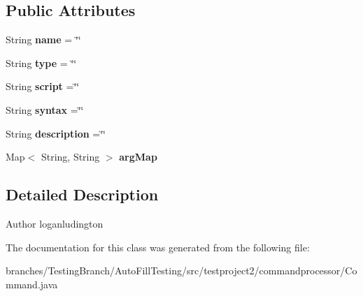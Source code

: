 \subsection*{Public Attributes}
\begin{DoxyCompactItemize}
\item 
\hypertarget{classtestproject2_1_1commandprocessor_1_1Command_a232df6f03dd12a7657d297b3897c8549}{String {\bfseries name} = \char`\"{}\char`\"{}}\label{classtestproject2_1_1commandprocessor_1_1Command_a232df6f03dd12a7657d297b3897c8549}

\item 
\hypertarget{classtestproject2_1_1commandprocessor_1_1Command_a0daaad17eed6ddd034d7e417f7db8189}{String {\bfseries type} = \char`\"{}\char`\"{}}\label{classtestproject2_1_1commandprocessor_1_1Command_a0daaad17eed6ddd034d7e417f7db8189}

\item 
\hypertarget{classtestproject2_1_1commandprocessor_1_1Command_a6afcbb229bc2c3df2165c285d01371e0}{String {\bfseries script} =\char`\"{}\char`\"{}}\label{classtestproject2_1_1commandprocessor_1_1Command_a6afcbb229bc2c3df2165c285d01371e0}

\item 
\hypertarget{classtestproject2_1_1commandprocessor_1_1Command_a957f91be63d8456141d9f982754cd43d}{String {\bfseries syntax} =\char`\"{}\char`\"{}}\label{classtestproject2_1_1commandprocessor_1_1Command_a957f91be63d8456141d9f982754cd43d}

\item 
\hypertarget{classtestproject2_1_1commandprocessor_1_1Command_a1d1093cfea4761f9e9bfffa52d6fb213}{String {\bfseries description} =\char`\"{}\char`\"{}}\label{classtestproject2_1_1commandprocessor_1_1Command_a1d1093cfea4761f9e9bfffa52d6fb213}

\item 
\hypertarget{classtestproject2_1_1commandprocessor_1_1Command_a7eefb4b8940b203b79c08998e74470f8}{Map$<$ String, String $>$ {\bfseries arg\-Map}}\label{classtestproject2_1_1commandprocessor_1_1Command_a7eefb4b8940b203b79c08998e74470f8}

\end{DoxyCompactItemize}


\subsection{Detailed Description}
\begin{DoxyAuthor}{Author}
loganludington 
\end{DoxyAuthor}


The documentation for this class was generated from the following file\-:\begin{DoxyCompactItemize}
\item 
branches/\-Testing\-Branch/\-Auto\-Fill\-Testing/src/testproject2/commandprocessor/Command.\-java\end{DoxyCompactItemize}
